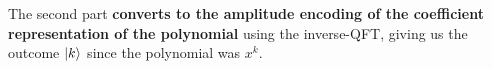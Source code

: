 \documentclass[12pt, a4paper]{article}
\begin{document}
	The second part \textbf{converts to the amplitude encoding of the coefficient representation of the polynomial} using the inverse-QFT, giving us the outcome $\ket{k}$ since the polynomial was $x^k$. 
	
	
	 
	
	
	
	

	
	
\end{document}
